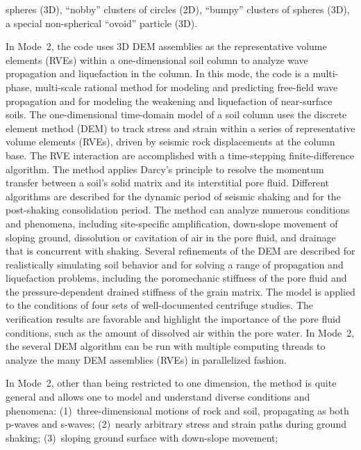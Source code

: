 \documentclass[letterpaper,11pt]{article}
\begin{document}
spheres (3D), 
``nobby'' clusters of circles (2D),
``bumpy'' clusters of spheres (3D),
a special non-spherical ``ovoid'' particle (3D).
%
\par
In Mode~2,
the code uses 3D DEM assemblies as the representative
volume elements (RVEs) within a one-dimensional soil column
to analyze wave propagation
and liquefaction in the column.
In this mode, the code is
a multi-phase, multi-scale rational
method for modeling and predicting free-field wave propagation
and for modeling
the weakening and liquefaction of near-surface soils.
The one-dimensional time-domain
model of a soil column uses the discrete element method (DEM) to track
stress and strain within
a series of representative volume elements (RVEs),
driven by seismic rock displacements at
the column base.
The RVE interaction are accomplished with a
time-stepping finite-difference algorithm.
The method applies Darcy's principle to resolve the
momentum transfer between a soil's solid matrix and its
interstitial pore fluid.
Different algorithms are described for the dynamic period of seismic
shaking and for the post-shaking consolidation period.
The method can analyze numerous conditions and phenomena,
including site-specific amplification,
down-slope movement of sloping ground,
dissolution or cavitation of air in the pore fluid,
and drainage that is concurrent with shaking.
Several refinements of the DEM are described for
realistically
simulating soil behavior and for solving a range
of propagation and liquefaction problems,
including the poromechanic stiffness of the pore fluid
and the pressure-dependent drained stiffness of the grain matrix.
The model is applied to the conditions of four sets of
well-documented centrifuge studies.
The verification results are favorable
and highlight the importance of the pore fluid conditions, such as
the amount of dissolved air within the pore water.
In Mode~2, the several DEM algorithm can be
run with multiple computing threads to analyze the many
DEM assemblies (RVEs) in parallelized fashion.
%
\par
In Mode~2,
other than being restricted to one dimension,
the method is quite general and allows one to model and understand
diverse conditions and phenomena:
(1)~three-dimensional motions of rock and soil,
propagating as both p-waves and s-waves;
(2)~nearly arbitrary stress and strain paths during
ground shaking;
(3)~sloping ground surface with down-slope movement;
\end{document}

